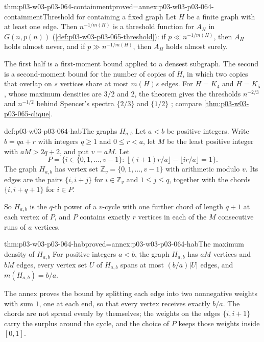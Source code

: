 \begin{hbtheorem}{thm:p03-w03-p03-064-containment}{proved=annex:p03-w03-p03-064-containment}{Threshold for containing a fixed graph}
Let \(H\) be a finite graph with at least one edge.  Then \(n^{-1/m(H)}\) is
a threshold function for \(A_H\) in \(G(n,p(n))\)
(\cref{def:p03-w03-p03-065-threshold}): if \(p\ll n^{-1/m(H)}\), then
\(A_H\) holds almost never, and if \(p\gg n^{-1/m(H)}\), then \(A_H\) holds
almost surely.
\end{hbtheorem}

The first half is a first-moment bound applied to a densest subgraph.  The
second is a second-moment bound for the number of copies of \(H\), in which
two copies that overlap on \(s\) vertices share at most \(m(H)s\) edges.
For \(H=K_4\) and \(H=K_5\), whose maximum densities are \(3/2\) and \(2\),
the theorem gives the thresholds \(n^{-2/3}\) and \(n^{-1/2}\) behind
Spencer's spectra \(\{2/3\}\) and \(\{1/2\}\)
\cite[pp.~15--16]{Spencer2007LogicRandomStructuresAuthor}; compare
\cref{thm:p03-w03-p03-065-clique}.

\begin{hbdefinition}{def:p03-w03-p03-064-hab}{The graphs \(H_{a,b}\)}
Let \(a<b\) be positive integers.  Write \(b=qa+r\) with integers \(q\geq1\)
and \(0\leq r<a\), let \(M\) be the least positive integer with
\(aM>2q+2\), and put \(v=aM\).  Let
\[
  P=\bigl\{i\in\{0,1,\ldots,v-1\}:\ \lfloor(i+1)r/a\rfloor-\lfloor ir/a\rfloor=1\bigr\}.
\]
The graph \(H_{a,b}\) has vertex set \(\mathbb Z_v=\{0,1,\ldots,v-1\}\) with
arithmetic modulo \(v\).  Its edges are the pairs \(\{i,i+j\}\) for
\(i\in\mathbb Z_v\) and \(1\leq j\leq q\), together with the chords
\(\{i,i+q+1\}\) for \(i\in P\).
\end{hbdefinition}

So \(H_{a,b}\) is the \(q\)-th power of a \(v\)-cycle with one further chord
of length \(q+1\) at each vertex of \(P\), and \(P\) contains exactly \(r\)
vertices in each of the \(M\) consecutive runs of \(a\) vertices.

\begin{hblemma}{thm:p03-w03-p03-064-hab}{proved=annex:p03-w03-p03-064-hab}{The maximum density of \(H_{a,b}\)}
For positive integers \(a<b\), the graph \(H_{a,b}\) has \(aM\) vertices and
\(bM\) edges, every vertex set \(U\) of \(H_{a,b}\) spans at most
\((b/a)|U|\) edges, and \(m(H_{a,b})=b/a\).
\end{hblemma}

The annex proves the bound by splitting each edge into two nonnegative
weights with sum \(1\), one at each end, so that every vertex receives exactly
\(b/a\).  The chords are not spread evenly by themselves; the weights on the
edges \(\{i,i+1\}\) carry the surplus around the cycle, and the choice of
\(P\) keeps those weights inside \([0,1]\).

